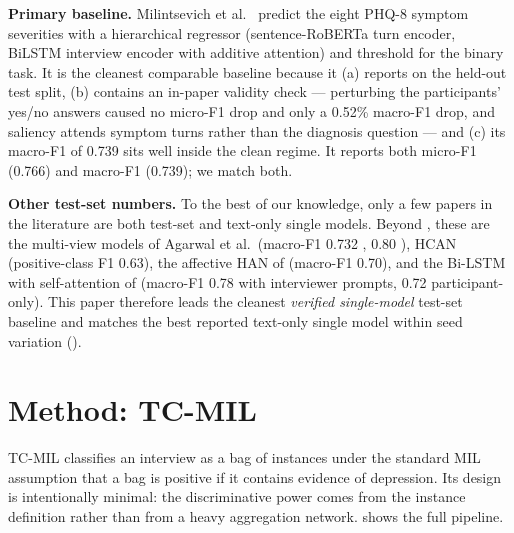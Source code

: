 \documentclass[conference]{IEEEtran}
\begin{document}
\textbf{Primary baseline.} Milintsevich et al.\ \cite{milintsevich2023}
predict the eight PHQ-8 symptom severities with a hierarchical regressor
(sentence-RoBERTa turn encoder, BiLSTM interview encoder with additive
attention) and threshold for the binary task. It is the cleanest comparable
baseline because it (a) reports on the held-out test split, (b) contains an
in-paper validity check --- perturbing the participants' yes/no answers caused
no micro-F1 drop and only a 0.52\% macro-F1 drop, and saliency attends symptom
turns rather than the diagnosis question --- and (c) its macro-F1 of 0.739
sits well inside the clean regime. It reports both micro-F1 (0.766) and
macro-F1 (0.739); we match both.

\textbf{Other test-set numbers.} To the best of our knowledge, only a few papers
in the literature are both test-set and text-only single models. Beyond
\cite{milintsevich2023}, these are the multi-view models of Agarwal et al.\
(macro-F1 0.732 \cite{agarwal2022mv}, 0.80 \cite{agarwal2024}), HCAN
\cite{mallolragolta2019} (positive-class F1 0.63), the affective HAN of
\cite{xezonaki20_interspeech} (macro-F1 0.70), and the Bi-LSTM with self-attention
of \cite{10006532} (macro-F1 0.78 with interviewer prompts, 0.72 participant-only).
This paper therefore leads the cleanest
\emph{verified single-model} test-set baseline \cite{milintsevich2023} and matches
the best reported text-only single model within seed variation
().

\section{Method: TC-MIL}
\label{sec:method}

TC-MIL classifies an interview as a bag of instances under the standard MIL
assumption that a bag is positive if it contains evidence of depression. Its
design is intentionally minimal: the discriminative power comes from the
instance definition rather than from a heavy aggregation network.
\Cref{fig:arch} shows the full pipeline.
\end{document}
